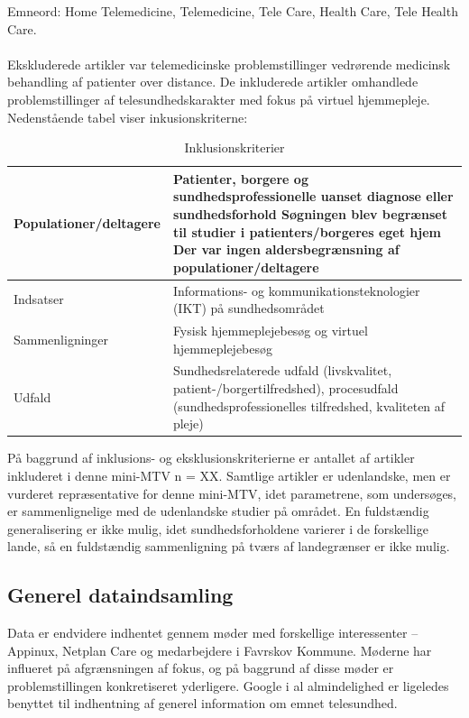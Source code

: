 Emneord: Home Telemedicine, Telemedicine, Tele Care, Health Care, Tele Health Care.\\ \\
Ekskluderede artikler var telemedicinske problemstillinger vedrørende medicinsk behandling af patienter over distance. De inkluderede artikler omhandlede problemstillinger af telesundhedskarakter med fokus på virtuel hjemmepleje. 
Nedenstående tabel viser inkusionskriterne:
\begin{table}[H]
\caption{Inklusionskriterier}
\label{tab:inklusionstabel}
\centering
\begin{tabularx}{\textwidth}{lX}
\hline
Populationer/deltagere & Patienter, borgere og sundhedsprofessionelle uanset diagnose eller sundhedsforhold
Søgningen blev begrænset til studier i patienters/borgeres eget hjem
Der var ingen aldersbegrænsning af populationer/deltagere\\ \hline
Indsatser             & Informations- og kommunikationsteknologier (IKT) på sundhedsområdet        \\ \hline
Sammenligninger             & Fysisk hjemmeplejebesøg og virtuel hjemmeplejebesøg          \\ \hline
Udfald             & Sundhedsrelaterede udfald (livskvalitet, patient-/borgertilfredshed), procesudfald (sundhedsprofessionelles tilfredshed, kvaliteten af pleje)          \\ \hline
\end{tabularx}
\end{table}

På baggrund af inklusions- og eksklusionskriterierne er antallet af artikler inkluderet i denne mini-MTV n = XX. Samtlige artikler er udenlandske, men er vurderet repræsentative for denne mini-MTV, idet parametrene, som undersøges, er sammenlignelige med de udenlandske studier på området. En fuldstændig generalisering er ikke mulig, idet sundhedsforholdene varierer i de forskellige lande, så en fuldstændig sammenligning på tværs af landegrænser er ikke mulig. 

\subsection{Generel dataindsamling}
Data er endvidere indhentet gennem møder med forskellige interessenter – Appinux, Netplan Care og medarbejdere i Favrskov Kommune. Møderne har influeret på afgrænsningen af fokus, og på baggrund af disse møder er problemstillingen konkretiseret yderligere. Google i al almindelighed er ligeledes benyttet til indhentning af generel information om emnet telesundhed.

